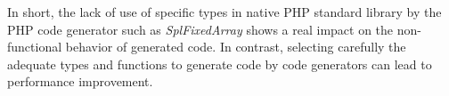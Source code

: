 In short, the lack of use of specific types in native PHP standard library by the PHP code generator such as \textit{SplFixedArray} shows a real impact on the non-functional behavior of generated code. In contrast, selecting carefully the adequate types and functions to generate code by code generators can lead to performance improvement.  


 






